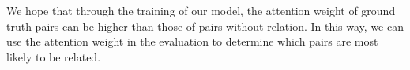 We hope that through the training of our model, the attention weight of ground truth pairs can be higher than those of pairs without relation. In this way, we can use the attention weight in the evaluation to determine which pairs are most likely to be related.
\begin{figure}[!htbp]
		\centering
	

\end{figure}

